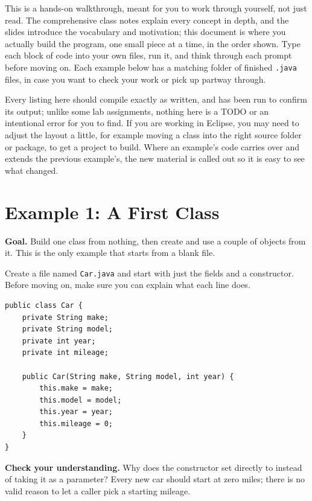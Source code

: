 \documentclass[11pt]{article}
\begin{document}

\noindent This is a hands-on walkthrough, meant for you to work through
yourself, not just read. The comprehensive class notes explain every concept
in depth, and the slides introduce the vocabulary and motivation; this
document is where you actually build the program, one small piece at a time,
in the order shown. Type each block of code into your own files, run it, and
think through each prompt before moving on. Each example below has a matching
folder of finished \texttt{.java} files, in case you want to check your work
or pick up partway through.

\noindent Every listing here should compile exactly as written, and has been
run to confirm its output; unlike some lab assignments, nothing here is a
TODO or an intentional error for you to find. If you are working in Eclipse,
you may need to adjust the layout a little, for example moving a class into
the right source folder or package, to get a project to build. Where an
example's code carries over and extends the previous example's, the new
material is called out so it is easy to see what changed.

\section{Example 1: A First Class}

\textbf{Goal.} Build one class from nothing, then create and use a couple of
objects from it. This is the only example that starts from a blank file.

Create a file named \texttt{Car.java} and start with just the fields and a
constructor. Before moving on, make sure you can explain what each line does.

\begin{lstlisting}[style=java]
public class Car {
    private String make;
    private String model;
    private int year;
    private int mileage;

    public Car(String make, String model, int year) {
        this.make = make;
        this.model = model;
        this.year = year;
        this.mileage = 0;
    }
}
\end{lstlisting}

\textbf{Check your understanding.} Why does the constructor set 
directly to  instead of taking it as a parameter? Every new car should
start at zero miles; there is no valid reason to let a caller pick a starting
mileage.
\end{document}
